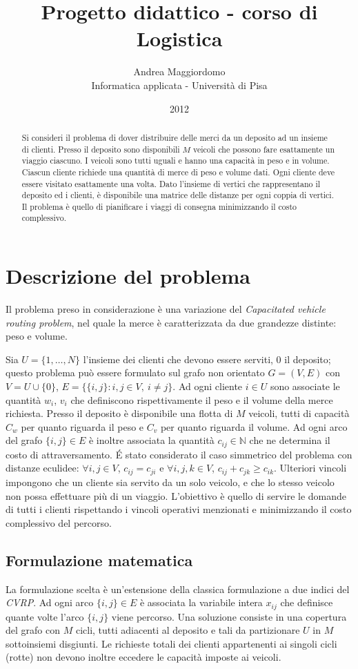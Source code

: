 \documentclass[11pt,oneside,a4paper]{article}
\title{Progetto didattico - corso di Logistica}
\author{Andrea Maggiordomo \\ Informatica applicata - Università di Pisa}
\date{2012}
\begin{document}
\maketitle

\begin{abstract}
Si consideri il problema di dover distribuire delle merci da un deposito ad un
insieme di clienti. Presso il deposito sono disponibili $M$ veicoli che possono
fare esattamente un viaggio ciascuno. I veicoli sono tutti uguali e hanno una 
capacità in peso e in volume. Ciascun cliente richiede una quantità di merce di 
peso e volume dati. Ogni cliente deve essere visitato esattamente una volta. Dato 
l'insieme di vertici che rappresentano il deposito ed i clienti, è disponibile una 
matrice delle distanze per ogni coppia di vertici. Il problema è quello di
pianificare i viaggi di consegna minimizzando il costo complessivo.
\end{abstract}

\section{Descrizione del problema}
Il problema preso in considerazione è una variazione del \emph{Capacitated
vehicle routing problem}, nel quale la merce è caratterizzata da due grandezze 
distinte: peso e volume.

Sia $U = \{1,\dots,N\}$ l'insieme dei clienti che devono essere serviti, $0$ il
deposito; questo problema può essere formulato sul grafo non orientato $G = (V,E)$
con $V = U \cup \{0\}$, $E = \{\{i,j\} : i,j \in V,\: i \neq j\}$.
Ad ogni cliente $i \in U$ sono associate le quantità $w_i$, $v_i$ che definiscono
rispettivamente il peso e il volume della merce richiesta. Presso il deposito è disponibile 
una flotta di $M$ veicoli, tutti di capacità $C_w$ per quanto riguarda il peso
e $C_v$ per quanto riguarda il volume.
Ad ogni arco del grafo $\{i,j\} \in E$ è inoltre associata la quantità
$c_{ij} \in \mathbb{N}$ che ne determina il costo di attraversamento.
É stato considerato il caso simmetrico del problema con distanze eculidee:
$\forall i,j \in V$, $c_{ij} = c_{ji}$ e $\forall i,j,k \in V$,
$c_{ij} + c_{jk} \geq c_{ik}$.
Ulteriori vincoli impongono che un cliente sia servito da un solo 
veicolo, e che lo stesso veicolo non possa effettuare più di un viaggio.
L'obiettivo è quello di servire le domande di tutti i clienti rispettando i vincoli operativi
menzionati e minimizzando il costo complessivo del percorso.

\subsection{Formulazione matematica}
La formulazione scelta è un'estensione della classica formulazione a due indici
del \emph{CVRP}. Ad ogni arco $\{i,j\} \in E$ è associata la variabile intera $x_{ij}$
che definisce quante volte l'arco $\{i,j\}$ viene percorso. Una soluzione consiste
in una copertura del grafo con $M$ cicli, tutti adiacenti al deposito
e tali da partizionare $U$ in $M$ sottoinsiemi disgiunti. Le richieste totali dei
clienti appartenenti ai singoli cicli (rotte) non devono inoltre eccedere le capacità imposte ai veicoli.
\end{document}
